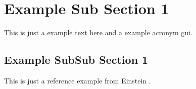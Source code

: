 \section{Example Sub Section 1}

This is just a example text here and a example acronym \ac{gui}.


\subsection{Example SubSub Section 1}

This is just a reference example from Einstein \cite{einstein}.